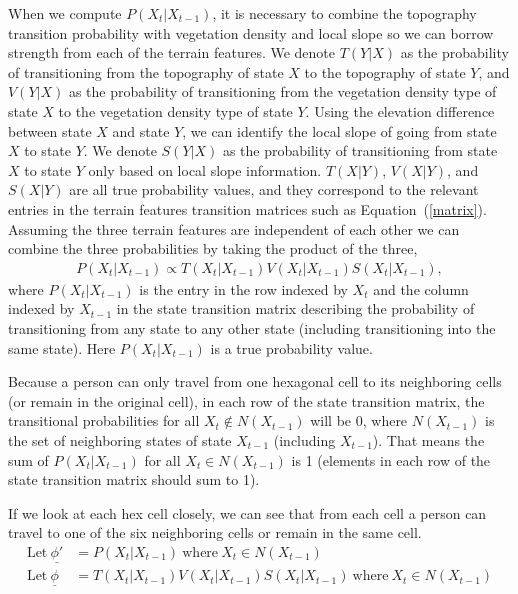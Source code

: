 \documentclass[smallextended,natbib]{svjour3}
\begin{document}
When we compute $P(X_t|X_{t-1})$, it is necessary to combine the topography transition probability with vegetation density and local slope so we can borrow strength from each of the terrain features. We denote $T(Y|X)$ as the probability of transitioning from the topography of state $X$ to the topography of state $Y$, and $V(Y|X)$ as the probability of transitioning from the vegetation density type of state $X$ to the vegetation density type of state $Y$. Using the elevation difference between state $X$ and state $Y$, we can identify the local slope of going from state $X$ to state $Y$. We denote $S(Y|X)$ as the probability of transitioning from state $X$ to state $Y$ only based on local slope information. $T(X|Y)$, $V(X|Y)$, and $S(X|Y)$ are all true probability values, and they correspond to the relevant entries in the terrain features transition matrices such as Equation~(\ref{matrix}). Assuming the three terrain features are independent of each other we can combine the three probabilities by taking the product of the three,
\begin{align}
\label{product}
P(X_t|X_{t-1}) \propto T(X_t|X_{t-1})V(X_t|X_{t-1})S(X_t|X_{t-1}),
\end{align}
where $P(X_t|X_{t-1})$ is the entry in the row indexed by $X_t$ and the column indexed by $X_{t-1}$ in the state transition matrix describing the probability of transitioning from any state to any other state (including transitioning into the same state). Here $P(X_t|X_{t-1})$ is a true probability value.

Because a person can only travel from one hexagonal cell to its neighboring cells (or remain in the original cell), in each row of the state transition matrix, the transitional probabilities for all $X_t \notin N(X_{t-1})$ will be 0, where $N(X_{t-1})$ is the set of neighboring states of state $X_{t-1}$ (including $X_{t-1}$). That means the sum of $P(X_t|X_{t-1})$ for all $X_t \in N(X_{t-1})$ is 1 (elements in each row of the state transition matrix should sum to 1). 

If we look at each hex cell closely, we can see that from each cell a person can travel to one of the six neighboring cells or remain in the same cell. 
\begin{align}
\label{sub}
\mathrm{Let}~\underline{\phi'} &= P(X_t|X_{t-1}) ~\mathrm{where}~ X_t \in N(X_{t-1})\\
\mathrm{Let}~\underline{\phi} &= T(X_t|X_{t-1})V(X_t|X_{t-1})S(X_t|X_{t-1}) ~\mathrm{where}~ X_t \in N(X_{t-1})
\end{align}
\end{document}

